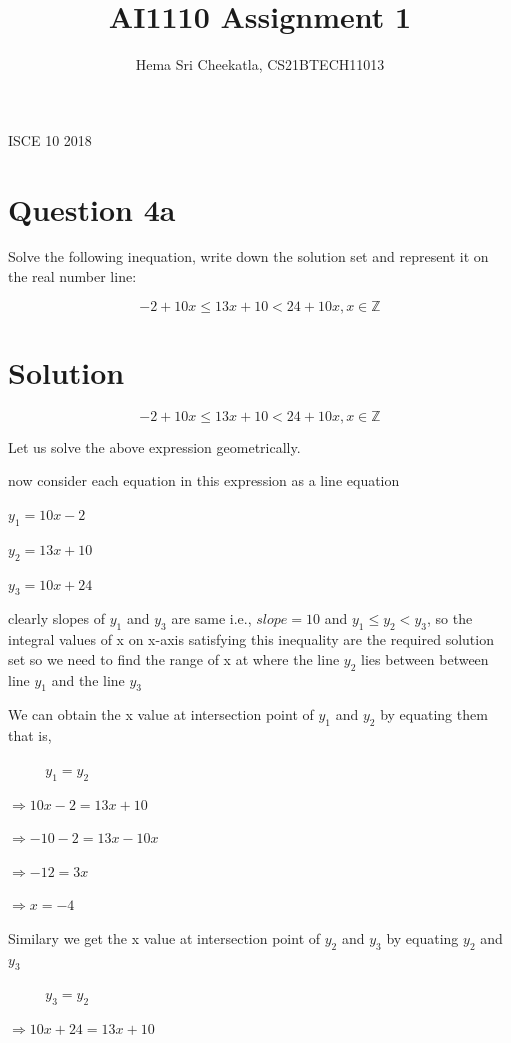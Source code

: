 \documentclass[16pt, a4paper]{article}
\title{AI1110 Assignment 1}
\author{Hema Sri Cheekatla, CS21BTECH11013}
\begin{document}
\maketitle
ISCE 10 2018
\section*{Question 4a}
Solve the following inequation, write down the solution set and represent it on the real number line:

\[  -2 + 10x \leq 13x + 10 < 24 + 10x,  x\in \mathbb{Z} \]

\section*{Solution}
\[  -2 + 10x \leq 13x + 10 < 24 + 10x,  x\in \mathbb{Z} \]

Let us solve the above expression geometrically.

now consider each equation in this expression as a line equation

$y_1 = 10x - 2$

$y_2 = 13x + 10$

$y_3 = 10x + 24$

clearly slopes of $y_1$ and $y_3$ are same i.e., $slope = 10$\newline
and $y_1 \leq y_2 < y_3 $, so the integral values of x on x-axis satisfying this inequality are the required solution set\newline
so we need to find the range of x at where the line $y_2$ lies between between line $y_1$ and the line $y_3$

We can obtain the x value at intersection point of $y_1$ and $y_2$ by equating them that is,


$\hspace{16pt}\hspace{16pt} y_1 = y_2$

$\Rightarrow 10x - 2 = 13x + 10$

$\Rightarrow -10 -2 = 13x - 10x$

$\Rightarrow -12 = 3x$

$\Rightarrow x = -4$

Similary we get the x value at intersection point of $y_2$ and $y_3$ by equating $y_2$ and $y_3$


$\hspace{16pt}\hspace{16pt} y_3 = y_2$

$\Rightarrow 10x + 24 = 13x + 10$
\end{document}
